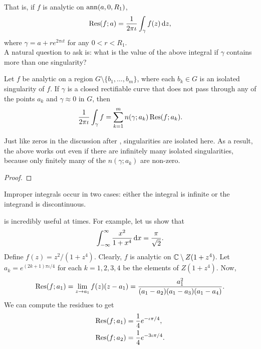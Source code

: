 	That is, if $f$ is analytic on $\operatorname{ann}(a,0,R_1)$,
	\[ \Res(f;a) = \frac{1}{2\pi\iota} \int_{\gamma} f(z) \dif z, \]
	where $\gamma = a + re^{2\pi\iota t}$ for any $0 < r < R_1$.\\
	A natural question to ask is: what is the value of the above integral if $\gamma$ contains more than one singularity?

	\begin{ftheo}
		\label{residue theorem}
		Let $f$ be analytic on a region $G \setminus \{b_1,\ldots,b_m\}$, where each $b_k \in G$ is an isolated singularity of $f$. If $\gamma$ is a closed rectifiable curve that does not pass through any of the points $a_k$ and $\gamma \approx 0$ in $G$, then
		\[ \frac{1}{2\pi\iota} \int_{\gamma} f = \sum_{k=1}^m n(\gamma;a_k) \operatorname{Res}(f;a_k). \]
	\end{ftheo}

	Just like zeros in the discussion after , singularities are isolated here. As a result, the above works out even if there are infinitely many isolated singularities, because only finitely many of the $n(\gamma;a_k)$ are non-zero.

	\begin{proof}
		
	\end{proof}

	Improper integrals occur in two cases: either the integral is infinite or the integrand is discontinuous.

	 is incredibly useful at times. For example, let us show that
	\[ \int_{-\infty}^\infty \frac{x^2}{1+x^4} \dif x = \frac{\pi}{\sqrt{2}}. \]
	Define $f(z) = z^2/(1+z^4)$. Clearly, $f$ is analytic on $\mathbb{C} \setminus Z(1+z^4)$. Let $a_k = e^{(2k+1)\pi\iota/4}$ for each $k = 1,2,3,4$ be the elements of $Z(1+z^4)$. Now,
	\[ \operatorname{Res}(f;a_1) = \lim_{z\to a_1} f(z) (z-a_1) = \frac{a_1^2}{(a_1 - a_2)(a_1 - a_3)(a_1 - a_4)}. \]
	We can compute the residues to get
	\begin{align*}
		\operatorname{Res}(f;a_1) &= \frac{1}{4} e^{-\iota\pi/4}, \\
		\operatorname{Res}(f;a_2) &= \frac{1}{4} e^{-3\iota\pi/4}.
	\end{align*}

